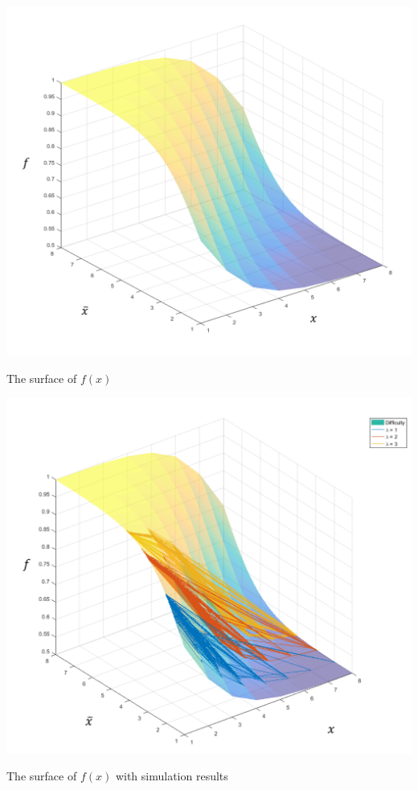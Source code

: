 \documentclass[a4paper,oneside,openany]{tufte-book}
\begin{document}
\begin{marginfigure}
  \includegraphics[width=\textwidth]{fig/f1.png}
  \caption{The surface of $f(x)$}
\end{marginfigure}

\begin{marginfigure}
  \includegraphics[width=\textwidth]{fig/f2.png}
  \caption{The surface of $f(x)$ with simulation results}
\end{marginfigure}
\end{document}
